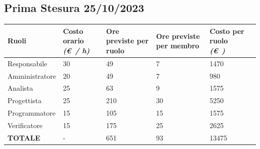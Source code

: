 \documentclass{article}
\begin{document}
\subsection{Prima Stesura 25/10/2023}
\begin{center}

    \begin{tabular}{|C{3cm}|C{2cm}|C{2cm}|C{2cm}|C{2cm}|C{2cm}|}
        \hline

        \textbf{Ruoli}  & \textbf{Costo orario} \linebreak \textit{(\euro\ / h)} & \textbf{Ore previste per ruolo} & \textbf{Ore previste per membro} & \textbf{Costo per ruolo} \linebreak \textit{(\euro\ )} \\
        \hline\hline

        Responsabile    & 30                                                     & 49                              & 7                                & 1470                                                   \\
        \hline

        Amministratore  & 20                                                     & 49                              & 7                                & 980                                                    \\
        \hline

        Analista        & 25                                                     & 63                              & 9                                & 1575                                                   \\
        \hline

        Progettista     & 25                                                     & 210                             & 30                               & 5250                                                   \\
        \hline

        Programmatore   & 15                                                     & 105                             & 15                               & 1575                                                   \\
        \hline

        Verificatore    & 15                                                     & 175                             & 25                               & 2625                                                   \\
        \hline\hline

        \textbf{TOTALE} & -                                                      & 651                             & 93                               & 13475                                                  \\
        \hline
    \end{tabular}
\end{center}
\end{document}
